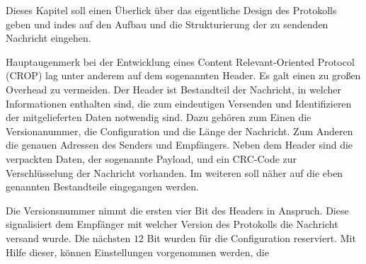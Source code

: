 Dieses Kapitel soll einen Überlick über das eigentliche Design des Protokolls
geben und indes auf den Aufbau und die Strukturierung der zu sendenden Nachricht
eingehen.

Hauptaugenmerk bei der Entwicklung eines Content Relevant-Oriented Protocol
(CROP) lag unter anderem auf dem sogenannten Header. Es galt einen zu großen
Overhead zu vermeiden. Der Header ist Bestandteil der Nachricht, in welcher
Informationen enthalten sind, die zum eindeutigen Versenden und Identifizieren
der mitgelieferten Daten notwendig sind. Dazu gehören zum Einen die
Versionanummer, die Configuration und die Länge der Nachricht. Zum Anderen die
genauen Adressen des Senders und Empfängers. Neben dem Header sind die
verpackten Daten, der sogenannte Payload, und ein CRC-Code zur Verschlüsselung
der Nachricht vorhanden. Im weiteren soll näher auf die eben genannten
Bestandteile eingegangen werden.

Die Versionsnummer nimmt die ersten vier Bit des Headers in Anspruch. Diese
signalisiert dem Empfänger mit welcher Version des Protokolls die Nachricht
versand wurde. Die nächsten $12$ Bit wurden für die Configuration reserviert.
Mit Hilfe dieser, können Einstellungen vorgenommen werden, die 